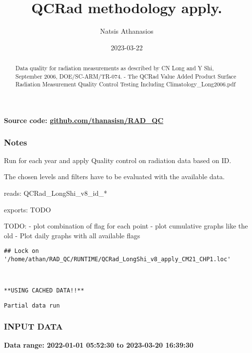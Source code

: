 \documentclass[
  10pt,
  a4paper,oneside]{article}
\title{QCRad methodology apply.}
\author{Natsis Athanasios}
\date{2023-03-22}
\begin{document}
\maketitle
\begin{abstract}
Data quality for radiation measurements as described by CN Long and Y Shi, September 2006, DOE/SC-ARM/TR-074. - The QCRad Value Added Product Surface Radiation Measurement Quality Control Testing Including Climatology\_Long2006.pdf
\end{abstract}

{
\hypersetup{linkcolor=}
\setcounter{tocdepth}{2}
\tableofcontents
}
\textbf{Source code: \href{https://github.com/thanasisn/RAD_QC}{github.com/thanasisn/RAD\_QC}}

\hypertarget{notes}{%
\subsubsection{Notes}\label{notes}}

Run for each year and apply Quality control on radiation data based on ID.

The chosen levels and filters have to be evaluated with the available data.

reads: QCRad\_LongShi\_v8\_id\_*

exports: TODO

TODO:
- plot combination of flag for each point
- plot cumulative graphs like the old
- Plot daily graphs with all available flags

\begin{verbatim}
## Lock on '/home/athan/RAD_QC/RUNTIME/QCRad_LongShi_v8_apply_CM21_CHP1.loc'
\end{verbatim}

\begin{verbatim}


**USING CACHED DATA!!**
\end{verbatim}

\begin{verbatim}
Partial data run
\end{verbatim}

\hypertarget{input-data}{%
\subsubsection{INPUT DATA}\label{input-data}}

\textbf{Data range: 2022-01-01 05:52:30 to 2023-03-20 16:39:30}
\end{document}
